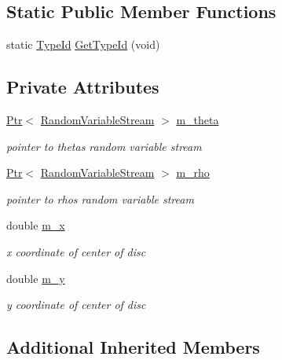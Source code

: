 \subsection*{Static Public Member Functions}
\begin{DoxyCompactItemize}
\item 
static \hyperlink{classns3_1_1TypeId}{Type\+Id} \hyperlink{classns3_1_1RandomDiscPositionAllocator_a671239e4563c093226f93af4e8ae9539}{Get\+Type\+Id} (void)
\end{DoxyCompactItemize}
\subsection*{Private Attributes}
\begin{DoxyCompactItemize}
\item 
\hyperlink{classns3_1_1Ptr}{Ptr}$<$ \hyperlink{classns3_1_1RandomVariableStream}{Random\+Variable\+Stream} $>$ \hyperlink{classns3_1_1RandomDiscPositionAllocator_ae31b2706470a36a86f55e80d30580a49}{m\+\_\+theta}
\begin{DoxyCompactList}\small\item\em pointer to theta\textquotesingle{}s random variable stream \end{DoxyCompactList}\item 
\hyperlink{classns3_1_1Ptr}{Ptr}$<$ \hyperlink{classns3_1_1RandomVariableStream}{Random\+Variable\+Stream} $>$ \hyperlink{classns3_1_1RandomDiscPositionAllocator_a2ece7a1600c3c7ca547e6b1f62408562}{m\+\_\+rho}
\begin{DoxyCompactList}\small\item\em pointer to rho\textquotesingle{}s random variable stream \end{DoxyCompactList}\item 
double \hyperlink{classns3_1_1RandomDiscPositionAllocator_a8642f8019a3621ad5e70347afeccd4f8}{m\+\_\+x}
\begin{DoxyCompactList}\small\item\em x coordinate of center of disc \end{DoxyCompactList}\item 
double \hyperlink{classns3_1_1RandomDiscPositionAllocator_a2ad7aee755524f830dd1c86b9d793495}{m\+\_\+y}
\begin{DoxyCompactList}\small\item\em y coordinate of center of disc \end{DoxyCompactList}\end{DoxyCompactItemize}
\subsection*{Additional Inherited Members}


